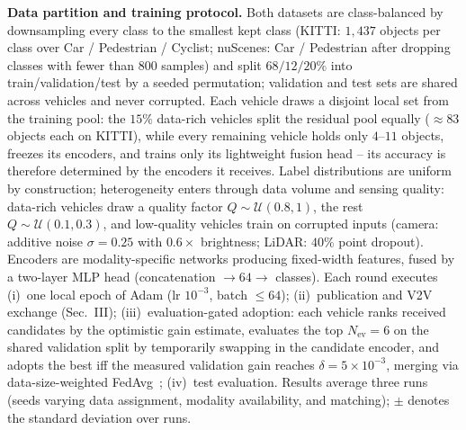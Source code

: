 
\textbf{Data partition and training protocol.}
Both datasets are class-balanced by downsampling every class to the
smallest kept class (KITTI: $1{,}437$ objects per class over Car /
Pedestrian / Cyclist; nuScenes: Car / Pedestrian after dropping classes
with fewer than $800$ samples) and split $68/12/20\%$ into
train/validation/test by a seeded permutation; validation and test sets
are shared across vehicles and never corrupted. Each vehicle draws a
disjoint local set from the training pool: the $15\%$ data-rich
vehicles split the residual pool equally (${\approx}83$ objects each on
KITTI), while every remaining vehicle holds only $4$--$11$ objects,
freezes its encoders, and trains only its lightweight fusion head --
its accuracy is therefore determined by the encoders it receives.
Label distributions are uniform by construction; heterogeneity enters
through data volume and sensing quality: data-rich vehicles draw a
quality factor $Q\sim\mathcal U(0.8,1)$, the rest
$Q\sim\mathcal U(0.1,0.3)$, and low-quality vehicles train on corrupted
inputs (camera: additive noise $\sigma{=}0.25$ with $0.6\times$
brightness; LiDAR: $40\%$ point dropout). Encoders are
modality-specific networks producing fixed-width features, fused by a
two-layer MLP head (concatenation $\to 64 \to$ classes). Each round
executes (i)~one local epoch of Adam (lr $10^{-3}$, batch $\le 64$);
(ii)~publication and V2V exchange (Sec.~III); (iii)~evaluation-gated
adoption: each vehicle ranks received candidates by the optimistic gain
estimate, evaluates the top $N_{\mathrm{ev}}{=}6$ on the shared
validation split by temporarily swapping in the candidate encoder, and
adopts the best iff the measured validation gain reaches
$\delta{=}5\times10^{-3}$, merging via data-size-weighted
FedAvg~\cite{fedavg}; (iv)~test evaluation. Results average three runs
(seeds varying data assignment, modality availability, and matching);
$\pm$ denotes the standard deviation over runs.


